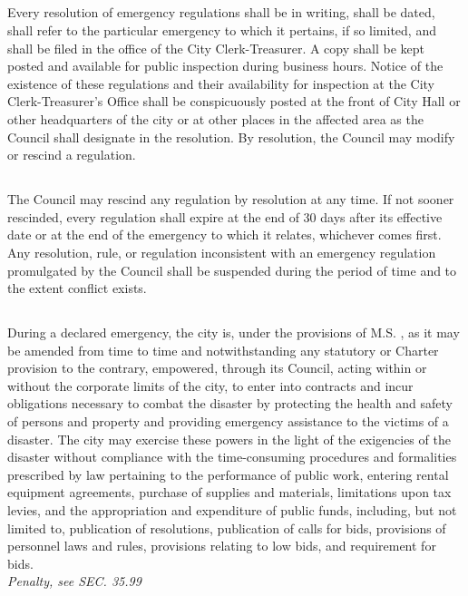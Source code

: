 \subsection{}
Every resolution of emergency regulations shall be in writing, shall be dated, shall refer to the particular emergency to which it pertains, if so limited, and shall be filed in the office of the City Clerk-Treasurer. A copy shall be kept posted and available for public inspection during business hours. Notice of the existence of these regulations and their availability for inspection at the City Clerk-Treasurer’s Office shall be conspicuously posted at the front of City Hall or other headquarters of the city or at other places in the affected area as the Council shall designate in the resolution. By resolution, the Council may modify or rescind a regulation.
\subsection{}
The Council may rescind any regulation by resolution at any time. If not sooner rescinded, every regulation shall expire at the end of 30 days after its effective date or at the end of the emergency to which it relates, whichever comes first. Any resolution, rule, or regulation inconsistent with an emergency regulation promulgated by the Council shall be suspended during the period of time and to the extent conflict exists.
\subsection{}
During a declared emergency, the city is, under the provisions of M.S. , as it may be amended from time to time and notwithstanding any statutory or Charter provision to the contrary, empowered, through its Council, acting within or without the corporate limits of the city, to enter into contracts and incur obligations necessary to combat the disaster by protecting the health and safety of persons and property and providing emergency assistance to the victims of a disaster. The city may exercise these powers in the light of the exigencies of the disaster without compliance with the time-consuming procedures and formalities prescribed by law pertaining to the performance of public work, entering rental equipment agreements, purchase of supplies and materials, limitations upon tax levies, and the appropriation and expenditure of public funds, including, but not limited to, publication of resolutions, publication of calls for bids, provisions of personnel laws and rules, provisions relating to low bids, and requirement for bids.\\
\emph{Penalty, see SEC. 35.99}

